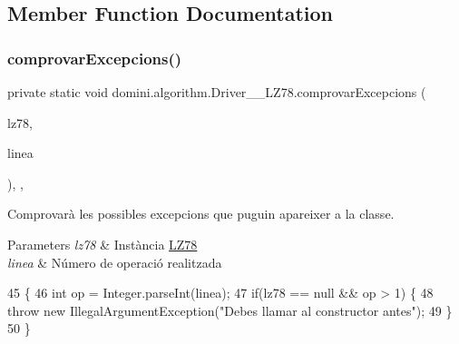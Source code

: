\subsection{Member Function Documentation}
\mbox{\label{classdomini_1_1algorithm_1_1Driver____LZ78_a21b185a3310ced322a1eb1b49f889f15}} 
\subsubsection{\texorpdfstring{comprovar\+Excepcions()}{comprovarExcepcions()}}
{\footnotesize\ttfamily private static void domini.\+algorithm.\+Driver\+\_\+\+\_\+\+L\+Z78.\+comprovar\+Excepcions (\begin{DoxyParamCaption}\item[{\hyperlink{classdomini_1_1algorithm_1_1LZ78}{L\+Z78}}]{lz78,  }\item[{String}]{linea }\end{DoxyParamCaption})\hspace{0.3cm}{\ttfamily [inline]}, {\ttfamily [static]}, {\ttfamily [private]}}



Comprovarà les possibles excepcions que puguin apareixer a la classe. 


\begin{DoxyParams}{Parameters}
{\em lz78} & Instància \hyperlink{classdomini_1_1algorithm_1_1LZ78}{L\+Z78} \\
\hline
{\em linea} & Número de operació realitzada \\
\hline
\end{DoxyParams}

\begin{DoxyCode}
45                                                                     \{
46         \textcolor{keywordtype}{int} op = Integer.parseInt(linea);
47         \textcolor{keywordflow}{if}(lz78 == null && op > 1) \{
48             \textcolor{keywordflow}{throw} \textcolor{keyword}{new} IllegalArgumentException(\textcolor{stringliteral}{"Debes llamar al constructor antes"});
49         \}
50     \}
\end{DoxyCode}
\mbox{\label{classdomini_1_1algorithm_1_1Driver____LZ78_a3f8db12503ffe92702d5b6670c56e792}} 
